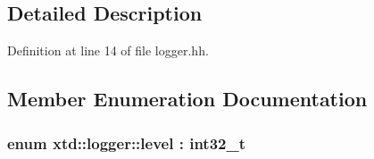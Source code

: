 \subsection{Detailed Description}


Definition at line 14 of file logger.\+hh.



\subsection{Member Enumeration Documentation}
\subsubsection[{\texorpdfstring{level}{level}}]{\setlength{\rightskip}{0pt plus 5cm}enum {\bf xtd\+::logger\+::level} \+: int32\+\_\+t\hspace{0.3cm}{\ttfamily [strong]}}\hypertarget{classxtd_1_1logger_a250ce2f143da181d7149a1556da2a6f1}{}\label{classxtd_1_1logger_a250ce2f143da181d7149a1556da2a6f1}
